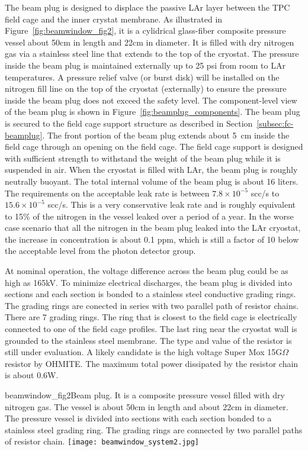 The beam plug is designed to displace the passive LAr layer between the TPC field cage and the inner crystat membrane. As illustrated in Figure~\ref{fig:beamwindow_fig2}, it is a cylidrical glass-fiber composite pressure vessel about 50cm in length and  22cm in diameter. It is filled with dry nitrogen gas via a stainless steel line that extends to the top of the cryostat. The pressure inside the beam plug is maintained externally up to 25 psi from room to LAr temperatures. A pressure relief valve (or burst disk) will be installed on the nitrogen fill line on the top of the cryostat (externally) to ensure the pressure inside the beam plug does not exceed the safety level. The component-level view of the beam plug is shown in Figure~\ref{fig:beamplug_components}.  The beam plug is secured to the field cage support structure as described in Section~\ref{subsec:fc-beamplug}. The front portion of the beam plug extends about 5~cm inside the field cage through an opening on the field cage. The field cage support is designed with sufficient strength to withstand the weight of the beam plug while it is suspended in air. When the cryostat is filled with LAr, the beam plug is roughly neutrally buoyant.  The total internal volume of the beam plug is about 16 liters. The requirements on the acceptable leak rate is between $7.8\times 10^{-5}$ scc/s to $15.6\times 10^{-5}$ scc/s. This is a very conservative leak rate and is roughly equivalent to 15\% of the nitrogen in the vessel leaked over a period of a year.  In the worse case scenario that all the nitrogen in the beam plug leaked into the LAr cryostat, the increase in concentration is about 0.1 ppm, which is still a factor of 10 below the acceptable level from the photon detector group.

At nominal operation, the voltage difference across the beam plug could be as high as 165kV. To minimize electrical discharges, the beam plug is divided into sections and each section is bonded to a stainless steel conductive grading rings. The grading rings are conected in series with two parallel path of resistor chains. There are 7 grading rings. The ring that is closest to the field cage is electrically connected to one of the field cage profiles. The last ring near the cryostat wall is grounded to the stainless steel membrane. The type and value of the resistor is still under evaluation. A likely candidate is the high voltage Super Mox 15G$\Omega$ resistor by OHMITE. The maximum total power dissipated by the resistor chain is about 0.6W.

\begin{cdrfigure}{beamwindow_fig2}{Beam plug. It is a  composite pressure vessel filled with dry nitrogen gas. The vessel is about 50cm in length and about 22cm in diameter. The pressure vessel is divided into sections with each section bonded to a stainless steel grading ring. The grading rings are connected by two parallel paths of resistor chain.}
  \texttt{[image: beamwindow\_system2.jpg]}
\end{cdrfigure}

